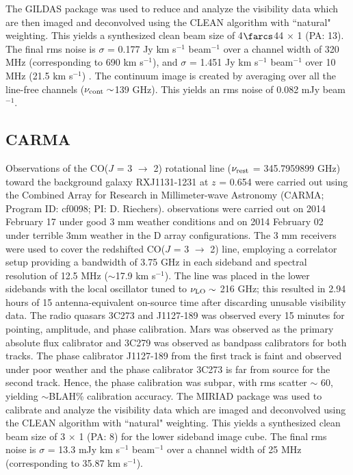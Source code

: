 \documentclass[]{emulateapj}
\begin{document}
{The GILDAS package was used to reduce and analyze the visibility data which are
then imaged and deconvolved using
the CLEAN algorithm with ``natural" weighting. This yields a synthesized clean
beam size of 4$\farcs$44 $\times$ 1 (PA: 13\degr). The final rms noise is $\sigma$ =
0.177 
Jy km s$^{-1}$ beam$^{-1}$ over a channel width of 320 MHz (corresponding to
690 km s$^{-1}$), and $\sigma$ = 1.451 Jy km s$^{-1}$ beam$^{-1}$ over 10 MHz 
(21.5 km s$^{-1}$) . 
The continuum image is created by %
averaging over all the line-free channels ($\nu_{\rm cont}\sim$139 GHz). This
yields an rms noise of 0.082 mJy beam$^{-1}$. %

\subsection{CARMA} \label{sec:carmadata}
%
Observations of the CO($J$ = 3 $\rightarrow$ 2) rotational line ($\nu_{\rm
rest}$ = 345.7959899 GHz) toward the background galaxy RXJ1131-1231 at $z$ = 
0.654
 were carried out using the Combined Array for Research in Millimeter-wave
Astronomy (CARMA; Program ID: cf0098; PI: D. Riechers).
observations were carried out on 2014 February 17 under good 3 mm weather
conditions and on 2014 February 02 under terrible 3mm weather in the D array
configurations.  The 3 mm receivers were used to cover
the 
redshifted CO($J$ = 3 $\rightarrow$ 2) line, employing a correlator setup
providing a bandwidth of 3.75 GHz in each sideband and spectral resolution of
12.5 MHz ($
\sim$17.9 km s$^{-1}$). The line was placed in the
lower sidebands with the local oscillator tuned to $\nu_{\rm LO}\sim$ 216 GHz;
this resulted in 2.94 hours of 15 antenna-equivalent on-source time after
discarding 
unusable visibility data. 
The radio quasars 3C273 and J1127-189 was observed every 15 minutes for
pointing, amplitude, and phase calibration. Mars was observed as the
primary
absolute flux calibrator and 3C279 was observed as bandpass calibrators for
both tracks. 
The phase calibrator J1127-189 from the first track is faint and observed under
poor weather and the phase calibrator 3C273 is far from source for the second
track. Hence, the phase calibration was 
subpar, with rms scatter $\sim$ 60\degr, 
yielding
$\sim
$BLAH\% calibration accuracy.
%
The MIRIAD package was used to calibrate and analyze the visibility data which
are imaged and deconvolved using
the CLEAN algorithm with ``natural" weighting. This yields a synthesized clean
beam size of 3 $\times$ 1 (PA: 8\degr) for the lower sideband
image cube. The
final 
rms noise is $\sigma$ = 13.3 mJy km s$^{-1}$ beam$^{-1}$ over a channel width
of
25 MHz (corresponding to 35.87 km s$^{-1}$). 

}
\end{document}
